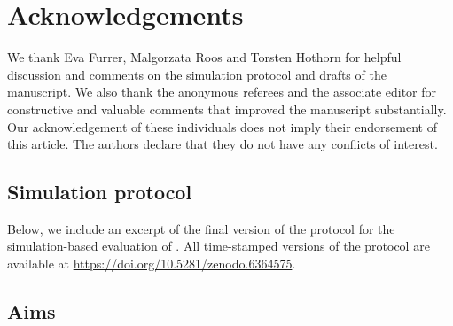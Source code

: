 \section*{Acknowledgements}
We thank Eva Furrer, Malgorzata Roos and Torsten Hothorn for helpful discussion
and comments on the simulation protocol and drafts of the manuscript. We also
thank the anonymous referees and the associate editor for constructive and
valuable comments that improved the manuscript substantially. Our
acknowledgement of these individuals does not imply their endorsement of this
article. The authors declare that they do not have any conflicts of interest.

\begin{subappendices}
\renewcommand{\thesection}{\Alph{section}}

\section{Simulation protocol}
\label{app6:protocol}

Below, we include an excerpt of the final version of the protocol for the
simulation-based evaluation of \ainet{}. All time-stamped versions of the
protocol are available at \url{https://doi.org/10.5281/zenodo.6364575}.

\subsection{Aims} \label{sec6:aims}


\end{subappendices}
